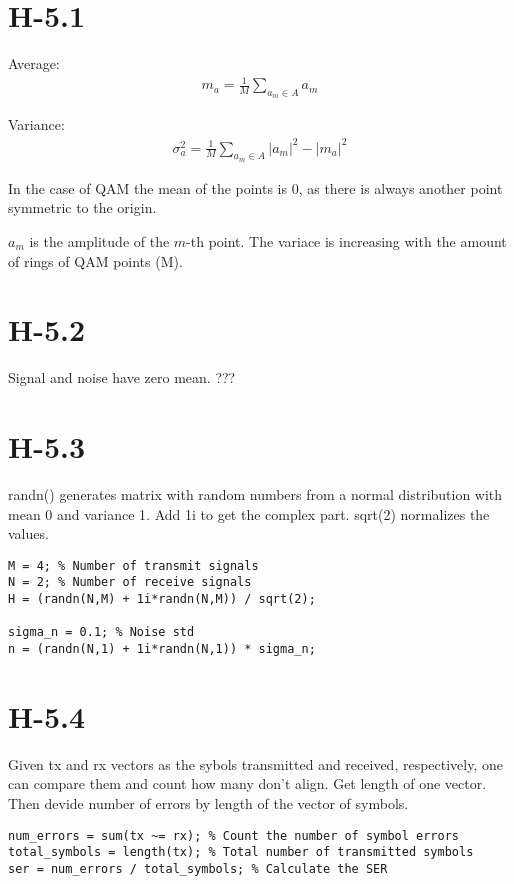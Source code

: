 \documentclass{article}
\begin{document}
\section{H-5.1}


Average:
\begin{align}
    m_a = \frac{1}{M} \sum_{a_m\in A} a_m
\end{align}

Variance:
\begin{align}
   \sigma_a^2 = \frac{1}{M} \sum_{a_m\in A} |a_m|^2 - |m_a|^2
\end{align}

In the case of QAM the mean of the points is 0, as there is always another point symmetric to the origin.

$a_m$ is the amplitude of the $m$-th point.
The variace is increasing with the amount of rings of QAM points (M).

\section{H-5.2}

Signal and noise have zero mean.
???

\section{H-5.3}

randn() generates matrix with random numbers from a normal distribution with mean 0 and variance 1.
Add 1i to get the complex part. sqrt(2) normalizes the values.

\begin{verbatim}
M = 4; % Number of transmit signals
N = 2; % Number of receive signals
H = (randn(N,M) + 1i*randn(N,M)) / sqrt(2);

sigma_n = 0.1; % Noise std
n = (randn(N,1) + 1i*randn(N,1)) * sigma_n;
\end{verbatim}

\section{H-5.4}

Given tx and rx vectors as the sybols transmitted and received, respectively, one can compare them and count how many don't align.
Get length of one vector.
Then devide number of errors by length of the vector of symbols.

\begin{verbatim}
num_errors = sum(tx ~= rx); % Count the number of symbol errors
total_symbols = length(tx); % Total number of transmitted symbols
ser = num_errors / total_symbols; % Calculate the SER
\end{verbatim}
\end{document}
